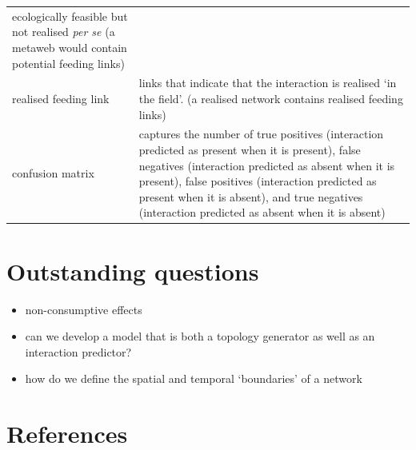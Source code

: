 \documentclass[
]{article}
\begin{document}
\begin{longtable}[]{@{}
  >{\raggedright\arraybackslash}p{}
  >{\raggedright\arraybackslash}p{}@{}}
ecologically feasible but not realised \emph{per se} (a metaweb would
contain potential feeding links) \\
realised feeding link & links that indicate that the interaction is
realised `in the field'. (a realised network contains realised feeding
links) \\
confusion matrix & captures the number of true positives (interaction
predicted as present when it is present), false negatives (interaction
predicted as absent when it is present), false positives (interaction
predicted as present when it is absent), and true negatives (interaction
predicted as absent when it is absent) \\
\end{longtable}

\section*{Outstanding questions}\label{outstanding-questions}

\begin{itemize}
\item
  non-consumptive effects
\item
  can we develop a model that is both a topology generator as well as an
  interaction predictor?
\item
  how do we define the spatial and temporal `boundaries' of a network
\end{itemize}

\section*{References}\label{references}
\end{document}
